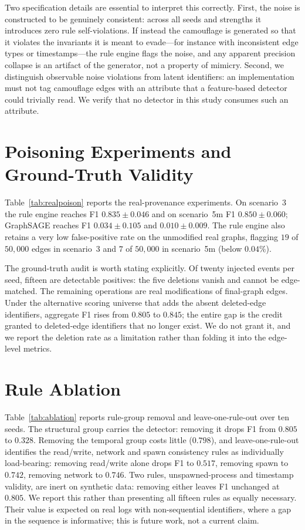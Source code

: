 \documentclass[journal]{IEEEtran}
\begin{document}
Two specification details are essential to interpret this correctly. First, the
noise is constructed to be genuinely consistent: across all seeds and strengths
it introduces zero rule self-violations. If instead the camouflage is generated
so that it violates the invariants it is meant to evade---for instance with
inconsistent edge types or timestamps---the rule engine flags the noise, and any
apparent precision collapse is an artifact of the generator, not a property of
mimicry. Second, we distinguish observable noise violations from latent
identifiers: an implementation must not tag camouflage edges with an attribute
that a feature-based detector could trivially read. We verify that no detector
in this study consumes such an attribute.

\section{Poisoning Experiments and Ground-Truth Validity}
\label{sec:poisongt}
Table~\ref{tab:realpoison} reports the real-provenance experiments. On scenario~3
the rule engine reaches F1 $0.835\pm0.046$ and on scenario~5m F1
$0.850\pm0.060$; GraphSAGE reaches F1 $0.034\pm0.105$ and $0.010\pm0.009$. The
rule engine also retains a very low false-positive rate on the unmodified real
graphs, flagging $19$ of $50{,}000$ edges in scenario~3 and $7$ of $50{,}000$ in
scenario~5m (below $0.04\%$).

The ground-truth audit is worth stating explicitly. Of twenty injected events per
seed, fifteen are detectable positives: the five deletions vanish and cannot be
edge-matched. The remaining operations are real modifications of final-graph
edges. Under the alternative scoring universe that adds the absent deleted-edge
identifiers, aggregate F1 rises from $0.805$ to $0.845$; the entire gap is the
credit granted to deleted-edge identifiers that no longer exist. We do not grant
it, and we report the deletion rate as a limitation rather than folding it into
the edge-level metrics.

\section{Rule Ablation}
\label{sec:ablation}
Table~\ref{tab:ablation} reports rule-group removal and leave-one-rule-out over
ten seeds. The structural group carries the detector: removing it drops F1 from
$0.805$ to $0.328$. Removing the temporal group costs little ($0.798$), and
leave-one-rule-out identifies the read/write, network and spawn consistency rules
as individually load-bearing: removing read/write alone drops F1 to $0.517$,
removing spawn to $0.742$, removing network to $0.746$. Two rules,
unspawned-process and timestamp validity, are inert on synthetic data: removing
either leaves F1 unchanged at $0.805$. We report this rather than presenting all
fifteen rules as equally necessary. Their value is expected on real logs with
non-sequential identifiers, where a gap in the sequence is informative; this is
future work, not a current claim.
\end{document}
